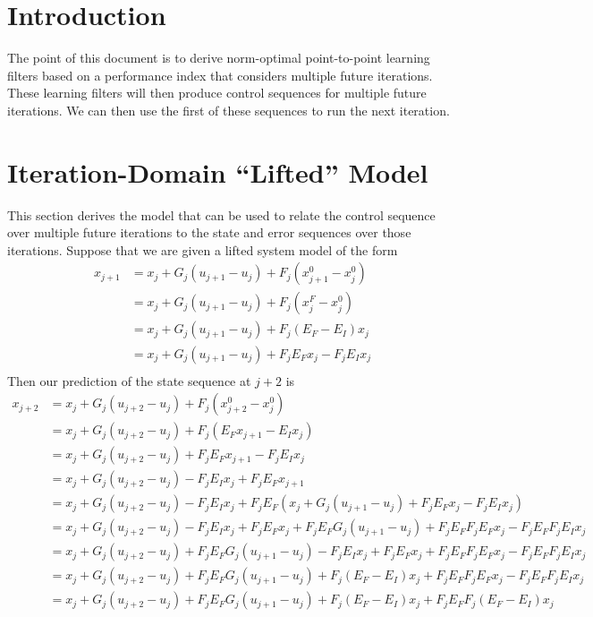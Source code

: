 \documentclass[landscape]{article}
\begin{document}
\section{Introduction}
The point of this document is to derive norm-optimal point-to-point learning filters based on a performance index that considers multiple future iterations.  These learning filters will then produce control sequences for multiple future iterations.  We can then use the first of these sequences to run the next iteration.

\section{Iteration-Domain ``Lifted'' Model}
This section derives the model that can be used to relate the control sequence over multiple future iterations to the state and error sequences over those iterations.  Suppose that we are given a lifted system model of the form
\begin{align}
x_{j+1} 
& = x_j + G_j(u_{j+1} - u_j) + F_j \left(x^0_{j+1} - x^0_j\right)\\
& = x_j + G_j(u_{j+1} - u_j) + F_j \left(x^F_{j} - x^0_j\right)\\
& = x_j + G_j(u_{j+1} - u_j) + F_j \left(E_F-E_I\right)x_j\\
& = x_j + G_j(u_{j+1} - u_j) + F_j E_F x_j - F_j E_I x_j\\
\end{align}
Then our prediction of the state sequence at $j+2$ is
\begin{align}
x_{j+2} 
& = x_j + G_j(u_{j+2}-u_j) + F_j \left(x^0_{j+2}-x^0_{j}\right)\\
& = x_j + G_j(u_{j+2}-u_j) + F_j \left(E_F x_{j+1}-E_I x_{j}\right)\\
& = x_j + G_j(u_{j+2}-u_j) + F_j E_F x_{j+1} - F_j E_I x_{j}\\
& = x_j + G_j(u_{j+2}-u_j) - F_j E_I x_{j}   + F_j E_F x_{j+1}\\
& = x_j + G_j(u_{j+2}-u_j) - F_j E_I x_{j}   + F_j E_F \left(x_j + G_j(u_{j+1} - u_j) + F_j E_F x_j - F_j E_I x_j\right)\\
& = x_j + G_j(u_{j+2}-u_j) - F_j E_I x_{j}   + F_j E_F x_j + F_j E_F G_j(u_{j+1} - u_j) + F_j E_F F_j E_F x_j - F_j E_F F_j E_I x_j\\
& = x_j + G_j(u_{j+2}-u_j) + F_j E_F G_j(u_{j+1} - u_j) - F_j E_I x_{j}   + F_j E_F x_j + F_j E_F F_j E_F x_j - F_j E_F F_j E_I x_j\\
& = x_j + G_j(u_{j+2}-u_j) + F_j E_F G_j(u_{j+1} - u_j) + F_j \left( E_F -E_I \right) x_{j} + F_j E_F F_j E_F x_j - F_j E_F F_j E_I x_j\\
& = x_j + G_j(u_{j+2}-u_j) + F_j E_F G_j(u_{j+1} - u_j) + F_j \left( E_F -E_I \right) x_{j} + F_j E_F F_j \left( E_F - E_I \right) x_j
\end{align}
\end{document}
